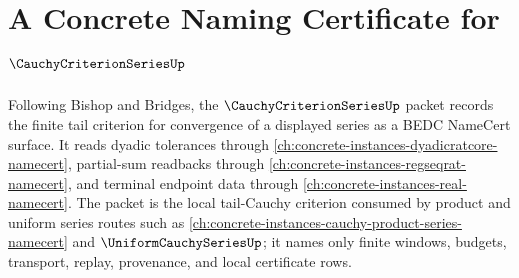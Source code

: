 \chapter{A Concrete Naming Certificate for $\CauchyCriterionSeriesUp$}
\label{ch:concrete-instances-cauchy-criterion-series-namecert}

Following Bishop and Bridges, the $\CauchyCriterionSeriesUp$ packet records the finite tail criterion for convergence of a displayed series as a BEDC NameCert surface. It reads dyadic tolerances through \autoref{ch:concrete-instances-dyadicratcore-namecert}, partial-sum readbacks through \autoref{ch:concrete-instances-regseqrat-namecert}, and terminal endpoint data through \autoref{ch:concrete-instances-real-namecert}. The packet is the local tail-Cauchy criterion consumed by product and uniform series routes such as \autoref{ch:concrete-instances-cauchy-product-series-namecert} and $\UniformCauchySeriesUp$; it names only finite windows, budgets, transport, replay, provenance, and local certificate rows.

